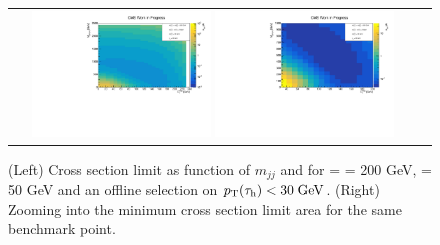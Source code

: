 \begin{figure}[tbh!]
	\centering
	\begin{tabular}{cc}
		\includegraphics[width=0.45\textwidth]{analysis/pics/JetInvMass_vs_MET_xsec_chi200_lsp050_taupt30.pdf}
		\includegraphics[width=0.45\textwidth]{analysis/pics/JetInvMass_vs_MET_xsec_chi200_lsp050_taupt30_zoom.pdf} 		
	\end{tabular}
	\caption{(Left) Cross section limit as function of $m_{jj}$ and \met for \charginopm = \neutralinotwo = 200 GeV, \neutralinoone = 50 GeV and an offline selection on $p_{\text{T}}(\tau_{\text{h}}) <  30\;\text{Ge}\kern-0.06667em\text{V}$. (Right) Zooming into the minimum cross section limit area for the same benchmark point.}
	\label{fig::JetInvMass_vs_MET_xsec_chi200_lsp050_taupt30}
\end{figure}

